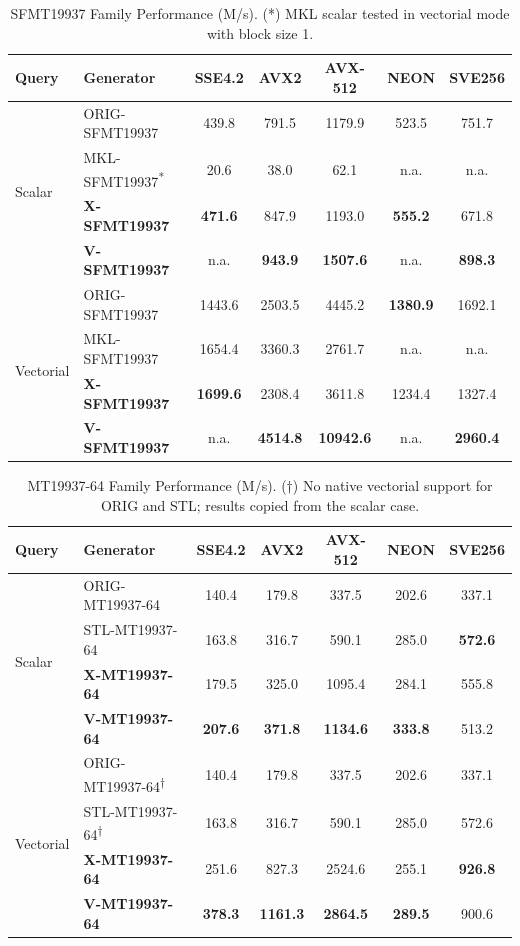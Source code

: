 \documentclass[preprint,1p,times]{elsarticle}
\begin{document}
\begin{table}[H]
\centering
\small
\begin{tabular}{|l|l|c|c|c|c|c|}
\hline
\textbf{Query} & \textbf{Generator} & \textbf{SSE4.2} & \textbf{AVX2} & \textbf{AVX-512} & \textbf{NEON} & \textbf{SVE256} \\
\hline
\multirow{4}{*}{Scalar}
 & ORIG-SFMT19937 & 439.8 & 791.5 & 1179.9 & 523.5 & 751.7 \\
 & MKL-SFMT19937\textsuperscript{*} & 20.6 & 38.0 & 62.1 & n.a. & n.a. \\
 & \textbf{X-SFMT19937} & \textbf{471.6} & 847.9 & 1193.0 & \textbf{555.2} & 671.8 \\
 & \textbf{V-SFMT19937} & n.a. & \textbf{943.9} & \textbf{1507.6} & n.a. & \textbf{898.3} \\
\hline
\multirow{4}{*}{Vectorial}
 & ORIG-SFMT19937 & 1443.6 & 2503.5 & 4445.2 & \textbf{1380.9} & 1692.1 \\
 & MKL-SFMT19937  & 1654.4 & 3360.3 & 2761.7 & n.a. & n.a. \\
 & \textbf{X-SFMT19937} & \textbf{1699.6} & 2308.4 & 3611.8 & 1234.4 & 1327.4 \\
 & \textbf{V-SFMT19937} & n.a. & \textbf{4514.8} & \textbf{10942.6} & n.a. & \textbf{2960.4} \\
\hline
\end{tabular}
\caption{\label{table:sfmt} SFMT19937 Family Performance (M/s).
	(*) MKL scalar tested in vectorial mode with block size 1.
    }
\end{table}

\begin{table}[H]
\centering
\small
\begin{tabular}{|l|l|c|c|c|c|c|}
\hline
\textbf{Query} & \textbf{Generator} & \textbf{SSE4.2} & \textbf{AVX2} & \textbf{AVX-512} & \textbf{NEON} & \textbf{SVE256} \\
\hline
\multirow{4}{*}{Scalar}
 & ORIG-MT19937-64 & 140.4 & 179.8 & 337.5 & 202.6 & 337.1 \\
 & STL-MT19937-64  & 163.8 & 316.7 & 590.1 & 285.0 & \textbf{572.6} \\
 & \textbf{X-MT19937-64} & 179.5 & 325.0 & 1095.4 & 284.1 & 555.8 \\
 & \textbf{V-MT19937-64} & \textbf{207.6} & \textbf{371.8} & \textbf{1134.6} & \textbf{333.8} & 513.2 \\
\hline
\multirow{4}{*}{Vectorial}
 & ORIG-MT19937-64\textsuperscript{†} & 140.4 & 179.8 & 337.5 & 202.6 & 337.1 \\
 & STL-MT19937-64\textsuperscript{†}  & 163.8 & 316.7 & 590.1 & 285.0 & 572.6 \\
 & \textbf{X-MT19937-64} & 251.6 & 827.3 & 2524.6 & 255.1 & \textbf{926.8} \\
 & \textbf{V-MT19937-64} & \textbf{378.3} & \textbf{1161.3} & \textbf{2864.5} & \textbf{289.5} & 900.6 \\
\hline
\end{tabular}
\caption{\label{table:mt64} MT19937-64 Family Performance (M/s).
	(†) No native vectorial support for ORIG and STL; results copied from the scalar case.
	}
\end{table}
\end{document}
